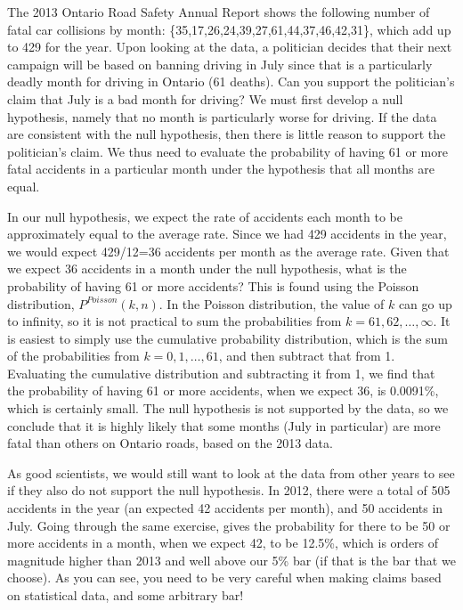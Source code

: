 \begin{example}{The 2013 Ontario Road Safety Annual Report shows the following number of fatal car collisions by month: \{35,17,26,24,39,27,61,44,37,46,42,31\}, which add up to 429 for the year. Upon looking at the data, a politician decides that their next campaign will be based on banning driving in July since that is a particularly deadly month for driving in Ontario (61 deaths). Can you support the politician's claim that July is a bad month for driving?}
We must first develop a null hypothesis, namely that no month is particularly worse for driving. If the data are consistent with the null hypothesis, then there is little reason to support the politician's claim. We thus need to evaluate the probability of having 61 or more fatal accidents in a particular month under the hypothesis that all months are equal. 

In our null hypothesis, we expect the rate of accidents each month to be approximately equal to the average rate. Since we had 429 accidents in the year, we would expect 429/12=36 accidents per month as the average rate. Given that we expect 36 accidents in a month under the null hypothesis, what is the probability of having 61 or more accidents? This is found using the Poisson distribution, $P^{Poisson}(k,n)$. In the Poisson distribution, the value of $k$ can go up to infinity, so it is not practical to sum the probabilities from $k=61, 62, \dots, \infty$. It is easiest to simply use the cumulative probability distribution, which is the sum of the probabilities from $k=0, 1, \dots, 61$, and then subtract that from 1.  Evaluating the cumulative distribution and subtracting it from 1, we find that the probability of having 61 or more accidents, when we expect 36, is 0.0091\%, which is certainly small. The null hypothesis is not supported by the data, so we conclude that it is highly likely that some months (July in particular) are more fatal than others on Ontario roads, based on the 2013 data.

As good scientists, we would still want to look at the data from other years to see if they also do not support the null hypothesis. In 2012, there were a total of 505 accidents in the year (an expected 42 accidents per month), and 50 accidents in July. Going through the same exercise, gives the probability for there to be 50 or more accidents in a month, when we expect 42, to be 12.5\%, which is orders of magnitude higher than 2013 and well above our 5\% bar (if that is the bar that we choose). As you can see, you need to be very careful when making claims based on statistical data, and some arbitrary bar!


\end{example}
